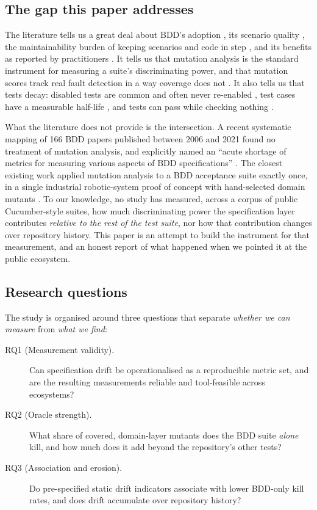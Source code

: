 \subsection{The gap this paper addresses}

The literature tells us a great deal about BDD's adoption \citep{zampetti2020demystifying}, its
scenario quality \citep{chandorkar2022gherkin,binamungu2020characterising}, the maintainability burden
of keeping scenarios and code in step \citep{binamungu2018maintaining,oliveira2019howtoevaluate}, and
its benefits as reported by practitioners \citep{couto2023characterization}. It tells us that mutation
analysis is the standard instrument for measuring a suite's discriminating power, and that mutation
scores track real fault detection in a way coverage does not \citep{Just2014AreMutants}. It also tells
us that tests decay: disabled tests are common and often never re-enabled \citep{Kim2021Disabled},
test cases have a measurable half-life \citep{Feldt2014GrowOld}, and tests can pass while checking
nothing \citep{Delplanque2019RottenGreen,zhi2013inadequateassertions}.

What the literature does not provide is the intersection. A recent systematic mapping of 166 BDD
papers published between 2006 and 2021 found no treatment of mutation analysis, and explicitly named
an ``acute shortage of metrics for measuring various aspects of BDD specifications''
\citep{binamungu2023mapping}. The closest existing work applied mutation analysis to a BDD acceptance
suite exactly once, in a single industrial robotic-system proof of concept with hand-selected domain
mutants \citep{santos2024aat4irs}. To our knowledge, no study has measured, across a corpus of public
Cucumber-style suites, how much discriminating power the specification layer contributes
\emph{relative to the rest of the test suite}, nor how that contribution changes over repository
history. This paper is an attempt to build the instrument for that measurement, and an honest report
of what happened when we pointed it at the public ecosystem.

\subsection{Research questions}

The study is organised around three questions that separate \emph{whether we can measure} from
\emph{what we find}:

\begin{description}
\item[RQ1 (Measurement validity).] Can specification drift be operationalised as a reproducible
      metric set, and are the resulting measurements reliable and tool-feasible across ecosystems?
\item[RQ2 (Oracle strength).] What share of covered, domain-layer mutants does the BDD suite
      \emph{alone} kill, and how much does it add beyond the repository's other tests?
\item[RQ3 (Association and erosion).] Do pre-specified static drift indicators associate with lower
      BDD-only kill rates, and does drift accumulate over repository history?
\end{description}

